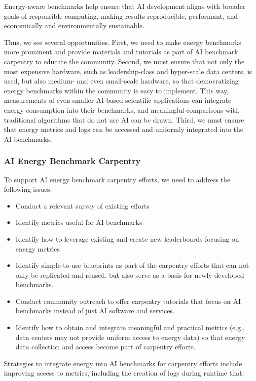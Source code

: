 Energy-aware benchmarks help ensure that AI development aligns with broader goals of responsible computing, making results reproducible, performant, and economically and environmentally sustainable. 

Thus, we see several opportunities. First, we need to make energy benchmarks more prominent and provide materials and tutorials as part of AI benchmark carpentry to educate the community. Second, we must ensure that not only the most expensive hardware, such as leadership-class and hyper-scale data centers, is used, but also medium- and even small-scale hardware, so that democratizing energy benchmarks within the community is easy to implement. This way, measurements of even smaller AI-based scientific applications can integrate energy consumption into their benchmarks, and meaningful comparisons with traditional algorithms that do not use AI can be drawn. Third, we must ensure that energy metrics and logs can be accessed and uniformly integrated into the AI benchmarks.

\subsubsection{AI Energy Benchmark Carpentry}

To support AI energy benchmark carpentry efforts, we need to address the following issues:

\begin{itemize}
\item Conduct a relevant survey of existing efforts
\item Identify metrics useful for AI benchmarks 
\item Identify how to leverage existing and create new leaderboards focusing on energy metrics
\item Identify simple-to-use blueprints as part of the carpentry efforts that can not only be replicated and reused, but also serve as a basis for newly developed benchmarks.
\item Conduct community outreach to offer carpentry tutorials that focus on AI benchmarks instead of just AI software and services.
\item Identify how to obtain and integrate meaningful and practical metrics (e.g., data centers may not provide uniform access to energy data) so that energy data collection and access become part of carpentry efforts.
\end{itemize}

Strategies to integrate energy into AI benchmarks for carpentry efforts include improving access to metrics, including the creation of logs during runtime that:

